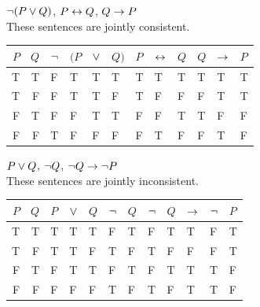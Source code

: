 \begin{small}
\begin{earg}

\item ${\neg}(P \vee Q)$, $P \leftrightarrow Q$, $Q \rightarrow P$\\
These sentences are jointly consistent.
\begin{flushleft}
\begin{tabular}{d d | f e e h | f  e  h | f  e  e }
$P$ & $Q$ & ${\neg}$ & $(P$ & $\vee$ & $Q)$ & $P$ & $\leftrightarrow$ & $Q$ & $Q$ & $\rightarrow$ & $P$\\
\hline
T & T &  F &   T & T & T &     T & T &  T &     T & T & T\Tstrut\\
T & F &  F &   T & T & F &     T & F &  F &      F & T & T\\   
F & T &  F &   F & T & T &     F & F &  T &      T & F & F\\
F & F &  T &   F & F & F &     F & T &  F &      F & T & F 
\end{tabular}
\end{flushleft}\medskip

\item $P \vee Q$, ${\neg} Q$, ${\neg} Q \rightarrow {\neg} P$\\
These sentences are jointly inconsistent.
\begin{flushleft}
\begin{tabular}{d d |  f  e  h  | f  h | f  e  e  e  e}
$P$ & $Q$ & $P$ & $\vee$ & $Q$ & ${\neg}$ & $Q$ & ${\neg}$ & $Q$ & $\rightarrow$ & ${\neg}$ & $P$\\
\hline
T & T &    T & T & T &   F & T &    F & T & T & F & T\Tstrut\\
T & F &    T & T & F &   T & F &    T & F & F & F & T\\   
F & T &    F & T & T &   F & T &    F & T & T & T & F\\
F & F &    F & F & F &   T & F &    T & F & T & T & F
\end{tabular}
\end{flushleft}\medskip


\end{earg}
\end{small}
